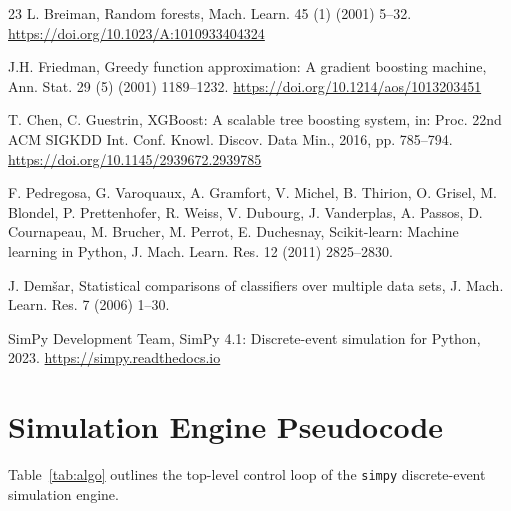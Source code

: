 \documentclass[3p,times]{elsarticle}
\begin{document}
\begin{thebibliography}{23}
L. Breiman,
Random forests,
Mach. Learn. 45 (1) (2001) 5--32.
\newline\url{https://doi.org/10.1023/A:1010933404324}

J.H. Friedman,
Greedy function approximation: A gradient boosting machine,
Ann. Stat. 29 (5) (2001) 1189--1232.
\newline\url{https://doi.org/10.1214/aos/1013203451}

T. Chen, C. Guestrin,
XGBoost: A scalable tree boosting system,
in: Proc. 22nd ACM SIGKDD Int. Conf. Knowl. Discov. Data Min.,
  2016, pp. 785--794.
\newline\url{https://doi.org/10.1145/2939672.2939785}

F. Pedregosa, G. Varoquaux, A. Gramfort, V. Michel,
  B. Thirion, O. Grisel, M. Blondel, P. Prettenhofer,
  R. Weiss, V. Dubourg, J. Vanderplas, A. Passos,
  D. Cournapeau, M. Brucher, M. Perrot, E. Duchesnay,
Scikit-learn: Machine learning in Python,
J. Mach. Learn. Res. 12 (2011) 2825--2830.

J. Dem\v{s}ar,
Statistical comparisons of classifiers over multiple data sets,
J. Mach. Learn. Res. 7 (2006) 1--30.

SimPy Development Team,
SimPy 4.1: Discrete-event simulation for Python, 2023.
\newline\url{https://simpy.readthedocs.io}

\end{thebibliography}

\appendix

\section{Simulation Engine Pseudocode}
\label{app:sim}

Table~\ref{tab:algo} outlines the top-level control loop of the
\texttt{simpy} discrete-event simulation engine.
\end{document}
